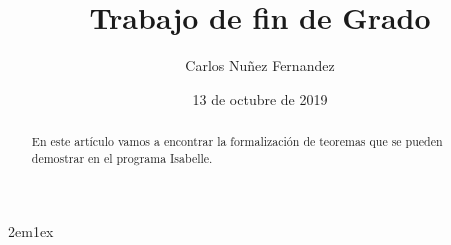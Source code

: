 \documentclass[12pt,a4paper]{article}
\begin{document}
\title{Trabajo de fin de Grado}
\author{Carlos Nuñez Fernandez}
\date{13 de octubre de 2019}
\maketitle

\begin{abstract}
  En este artículo vamos a encontrar la formalización de teoremas que se pueden demostrar en el programa Isabelle.
\end{abstract}

\tableofcontents

\parindent 2em\parskip 1ex



\nocite{LMF, tutorial}


\end{document}
